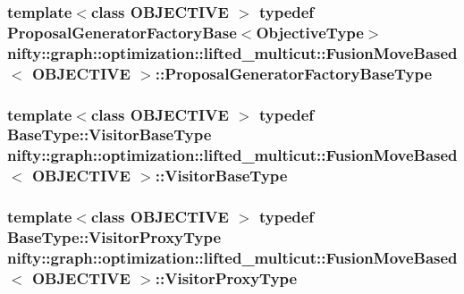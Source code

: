 \subsubsection[{Proposal\+Generator\+Factory\+Base\+Type}]{\setlength{\rightskip}{0pt plus 5cm}template$<$class O\+B\+J\+E\+C\+T\+I\+V\+E $>$ typedef {\bf Proposal\+Generator\+Factory\+Base}$<${\bf Objective\+Type}$>$ {\bf nifty\+::graph\+::optimization\+::lifted\+\_\+multicut\+::\+Fusion\+Move\+Based}$<$ O\+B\+J\+E\+C\+T\+I\+V\+E $>$\+::{\bf Proposal\+Generator\+Factory\+Base\+Type}}\label{classnifty_1_1graph_1_1optimization_1_1lifted__multicut_1_1FusionMoveBased_a7ce904e15086b0dffc73d1fc35a1f7ac}
\hypertarget{classnifty_1_1graph_1_1optimization_1_1lifted__multicut_1_1FusionMoveBased_ab99f9c64149f5748cb98d37b97e1eb4e}{}
\subsubsection[{Visitor\+Base\+Type}]{\setlength{\rightskip}{0pt plus 5cm}template$<$class O\+B\+J\+E\+C\+T\+I\+V\+E $>$ typedef {\bf Base\+Type\+::\+Visitor\+Base\+Type} {\bf nifty\+::graph\+::optimization\+::lifted\+\_\+multicut\+::\+Fusion\+Move\+Based}$<$ O\+B\+J\+E\+C\+T\+I\+V\+E $>$\+::{\bf Visitor\+Base\+Type}}\label{classnifty_1_1graph_1_1optimization_1_1lifted__multicut_1_1FusionMoveBased_ab99f9c64149f5748cb98d37b97e1eb4e}
\hypertarget{classnifty_1_1graph_1_1optimization_1_1lifted__multicut_1_1FusionMoveBased_a90007609e3d57ad1fb9bea79930db60a}{}
\subsubsection[{Visitor\+Proxy\+Type}]{\setlength{\rightskip}{0pt plus 5cm}template$<$class O\+B\+J\+E\+C\+T\+I\+V\+E $>$ typedef {\bf Base\+Type\+::\+Visitor\+Proxy\+Type} {\bf nifty\+::graph\+::optimization\+::lifted\+\_\+multicut\+::\+Fusion\+Move\+Based}$<$ O\+B\+J\+E\+C\+T\+I\+V\+E $>$\+::{\bf Visitor\+Proxy\+Type}}\label{classnifty_1_1graph_1_1optimization_1_1lifted__multicut_1_1FusionMoveBased_a90007609e3d57ad1fb9bea79930db60a}



